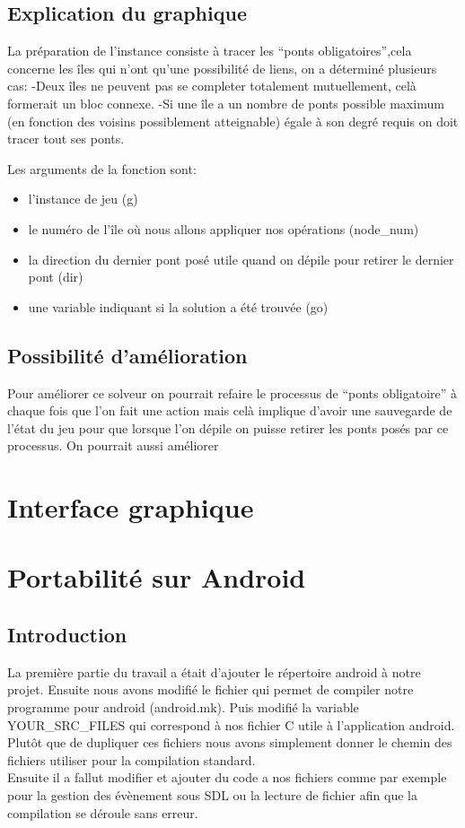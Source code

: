 \documentclass[12pt]{report}
\begin{document}
\section{Explication du graphique}
La préparation de l'instance consiste à tracer les ``ponts obligatoires'',cela concerne les îles qui n'ont qu'une possibilité de liens,
on a déterminé plusieurs cas:\newline
-Deux îles ne peuvent pas se completer totalement mutuellement, celà formerait un bloc connexe.\newline
-Si une île a un nombre de ponts possible maximum (en fonction des voisins possiblement atteignable) égale à son degré requis on doit tracer tout ses ponts.\newline

Les arguments de la fonction sont:
\begin{itemize}
\item l'instance de jeu (g)
\item le numéro de l'île où nous allons appliquer nos opérations (node\_num)
\item la direction du dernier pont posé utile quand on dépile pour retirer le dernier pont (dir)
\item une variable indiquant si la solution a été trouvée (go)
\end{itemize}

\section{Possibilité d'amélioration}
Pour améliorer ce solveur on pourrait refaire le processus de ``ponts obligatoire'' à chaque fois que l'on fait une action mais celà implique d'avoir une sauvegarde de l'état du jeu pour que lorsque l'on dépile on puisse retirer les ponts posés par ce processus. On pourrait aussi améliorer 

\newpage
\chapter{Interface graphique}
\newpage
\chapter{Portabilité sur Android}
\section{Introduction}
\textnormal{La première partie du travail a était d'ajouter le répertoire android à notre projet. Ensuite nous avons modifié le fichier qui permet de compiler notre programme pour android (android.mk). Puis modifié la variable YOUR\_SRC\_FILES qui correspond à nos fichier C utile à l'application android. Plutôt que de dupliquer ces fichiers nous avons simplement donner le chemin des fichiers utiliser pour la compilation standard.\\Ensuite il a fallut modifier et ajouter du code a nos fichiers comme par exemple pour la gestion des évènement sous SDL ou la lecture de fichier afin que la compilation se déroule sans erreur.}
\end{document}
